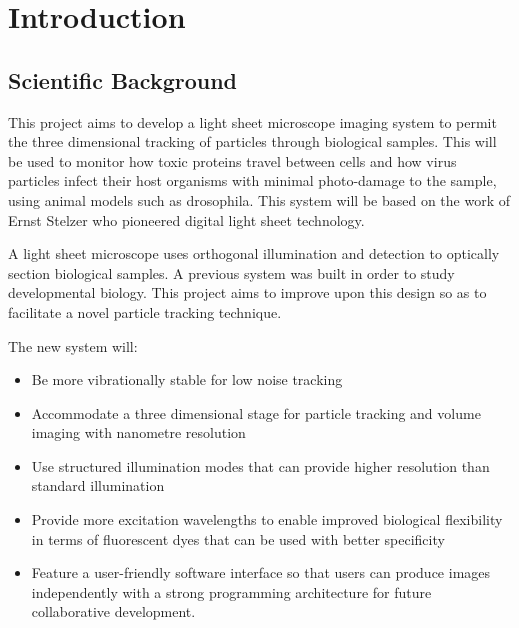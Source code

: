 
\ifpdf
    \graphicspath{{Chapters/intro/Figs/Raster/}{Chapters/intro/Figs/PDF/}{Chapters/intro/Figs/}}
\else
    \graphicspath{{Chapters/intro/Figs/Vector/}{Chapters/intro/Figs/}}
\fi

\chapter{Introduction}


\section{Scientific Background}
This project aims to develop a light sheet microscope imaging system to permit the three dimensional tracking of particles through biological samples.
This will be used to monitor how toxic proteins travel between cells and how virus particles infect their host organisms with minimal %
photo-damage to the sample, using animal models such as drosophila.
This system will be based on the work of Ernst Stelzer who pioneered digital light sheet technology\cite{Huisken2004}.

A light sheet microscope uses orthogonal illumination and detection to optically section biological samples.
A previous system was built in order to study developmental biology.
This project aims to improve upon this design so as to facilitate a novel particle tracking technique.

The new system will:
\begin{itemize}
	\item Be more vibrationally stable for low noise tracking
	\item Accommodate a three dimensional stage for particle tracking and volume imaging with nanometre resolution
	\item Use structured illumination modes that can provide higher resolution than standard illumination
	\item Provide more excitation wavelengths to enable improved biological flexibility in terms of fluorescent dyes that can be used with better specificity
	\item Feature a user-friendly software interface so that users can produce images independently with a strong programming architecture for future collaborative development.
\end{itemize}

